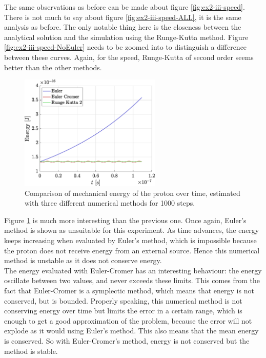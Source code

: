 \documentclass[a4paper,12pt,twoside]{article}
\begin{document}
The same observations as before can be made about figure \ref{fig:ex2-iii-speed}.
There is not much to say about figure \ref{fig:ex2-iii-speed-ALL}, it is the same analysis as before.
The only notable thing here is the closeness between the analytical solution and the simulation using the Runge-Kutta method.
Figure \ref{fig:ex2-iii-speed-NoEuler} needs to be zoomed into to distinguish a difference between these curves.
Again, for the speed, Runge-Kutta of second order seems better than the other methods.\\

\begin{figure}[h]
\centering
	\includegraphics[width=0.6\textwidth]{graphs/ex2_iii_ene.eps}
	\caption{Comparison of mechanical energy of the proton over time, estimated with three different numerical methods for \num{1000} steps.}
	\label{fig:ex2_iii_ene}
\end{figure}

Figure \ref{fig:ex2_iii_ene} is much more interesting than the previous one.
Once again, Euler's method is shown as unsuitable for this experiment.
As time advances, the energy keeps increasing when evaluated by Euler's method, which is impossible because the proton does not receive energy from an external source.
Hence this numerical method is unstable as it does not conserve energy.\\

The energy evaluated with Euler-Cromer has an interesting behaviour: the energy oscillate between two values, and never exceeds these limits.
This comes from the fact that Euler-Cromer is a symplectic method, which means that energy is not conserved, but is bounded.
Properly speaking, this numerical method is not conserving energy over time but limits the error in a certain range, which is enough to get a good approximation of the problem, because the error will not explode as it would using Euler's method.
This also means that the mean energy is conserved.
So with Euler-Cromer's method, energy is not conserved but the method is stable.\\
\end{document}
